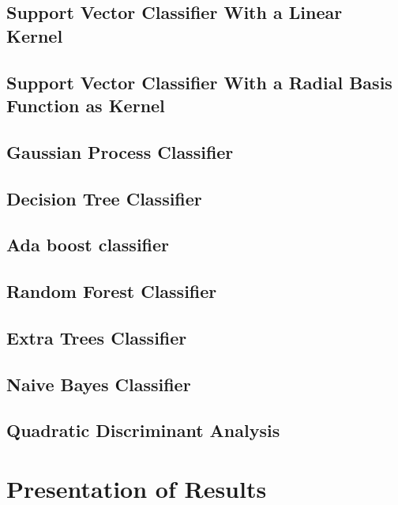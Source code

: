 \subsection*{Support Vector  Classifier With a Linear Kernel}

\subsection*{Support Vector  Classifier With a Radial Basis Function as Kernel}

\subsection*{Gaussian Process Classifier}

\subsection*{Decision Tree Classifier}

\subsection*{Ada boost classifier}

\subsection*{Random Forest Classifier}

\subsection*{Extra Trees Classifier}

\subsection*{Naive Bayes Classifier}

\subsection*{Quadratic Discriminant Analysis}

\section{Presentation of Results}